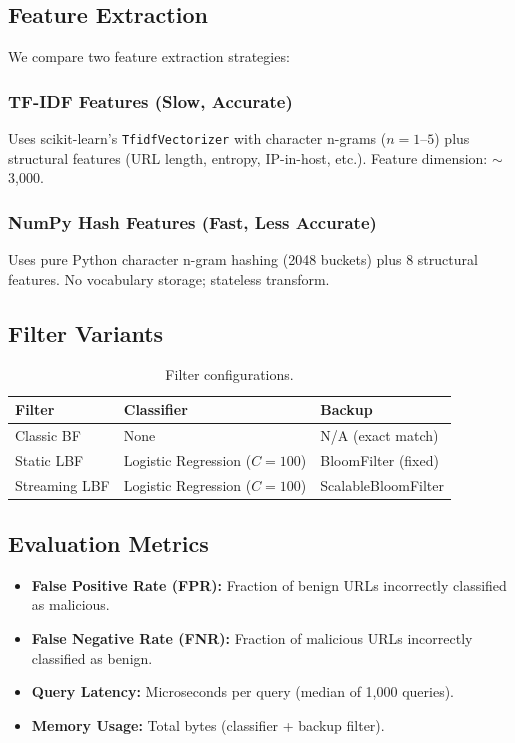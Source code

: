 \documentclass[11pt,a4paper]{article}
\begin{document}
\subsection{Feature Extraction}

We compare two feature extraction strategies:

\subsubsection{TF-IDF Features (Slow, Accurate)}

Uses scikit-learn's \texttt{TfidfVectorizer} with character n-grams ($n=1$--$5$) plus structural features (URL length, entropy, IP-in-host, etc.). Feature dimension: $\sim$3,000.

\subsubsection{NumPy Hash Features (Fast, Less Accurate)}

Uses pure Python character n-gram hashing (2048 buckets) plus 8 structural features. No vocabulary storage; stateless transform.

\subsection{Filter Variants}

\begin{table}[H]
\centering
\begin{tabular}{@{}lll@{}}
\toprule
\textbf{Filter} & \textbf{Classifier} & \textbf{Backup} \\
\midrule
Classic BF & None & N/A (exact match) \\
Static LBF & Logistic Regression ($C=100$) & BloomFilter (fixed) \\
Streaming LBF & Logistic Regression ($C=100$) & ScalableBloomFilter \\
\bottomrule
\end{tabular}
\caption{Filter configurations.}
\label{tab:config}
\end{table}

\subsection{Evaluation Metrics}

\begin{itemize}
    \item \textbf{False Positive Rate (FPR):} Fraction of benign URLs incorrectly classified as malicious.
    \item \textbf{False Negative Rate (FNR):} Fraction of malicious URLs incorrectly classified as benign.
    \item \textbf{Query Latency:} Microseconds per query (median of 1,000 queries).
    \item \textbf{Memory Usage:} Total bytes (classifier + backup filter).
\end{itemize}
\end{document}

